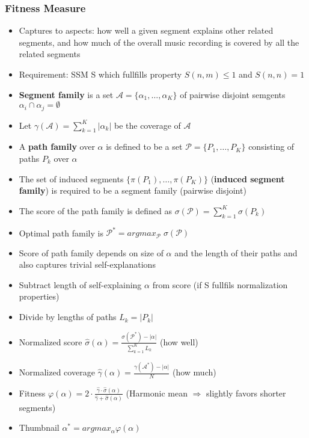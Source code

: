 \documentclass{scrartcl}
\newcommand{\ffrac}[2]{\ensuremath{\frac{\displaystyle #1}{\displaystyle #2}}}
\begin{document}
\subsubsection*{Fitness Measure}
\begin{itemize}
    \item
        Captures to aspects: how well a given segment explains other related segments, and how much of the overall music recording is covered by all the related segments
    \item
        Requirement: SSM S which fullfills property $S(n,m) \leq 1$ and $S(n,n) = 1$\\
    \item
        \textbf{Segment family} is a set $\mathcal{A}=\{\alpha_1, \dots, \alpha_K\}$ of pairwise disjoint semgents $\alpha_i \cap \alpha_j = \emptyset$
    \item
        Let $\gamma(\mathcal{A}) = \sum_{k=1}^{K} |\alpha_k|$ be the coverage of $\mathcal{A}$
    \item
        A \textbf{path family} over $\alpha$ is defined to be a set $\mathcal{P} = \{P_1, \dots, P_K\}$ consisting of paths $P_k$ over $\alpha$
    \item
        The set of induced segments $\{\pi(P_1), \dots, \pi(P_K)\}$ (\textbf{induced segment family}) is required to be a segment family (pairwise disjoint)
    \item
        The score of the path family is defined as $\sigma(\mathcal{P}) = \sum_{k=1}^K \sigma(P_k)$
    \item
        Optimal path family is $\mathcal{P}^* = argmax_{\mathcal{P}}\;\sigma(\mathcal{P})$\\
    \item
        Score of path family depends on size of $\alpha$ and the length of their paths and also captures trivial self-explanations
    \item
        Subtract length of self-explaining $\alpha$ from score (if S fullfils normalization properties)
    \item
        Divide by lengths of paths $L_k = |P_k|$
    \item
        Normalized score $\hat{\sigma}(\alpha) = \frac{\sigma(\mathcal{P}^*) - |\alpha|}{\sum_{k=1}^K L_k}$ (how well)
    \item
        Normalized coverage $\hat{\gamma}(\alpha) = \frac{\gamma(\mathcal{A}^*) - |\alpha|}{N}$ (how much)
    \item
        Fitness $\varphi(\alpha) = 2\cdot \ffrac{\hat{\gamma} \cdot \hat{\sigma}(\alpha)}{\hat{\gamma} + \hat{\sigma}(\alpha)}$ (Harmonic mean $\Rightarrow$ slightly favors shorter segments)
    \item
        Thumbnail $\alpha^* = argmax_{\alpha}\varphi(\alpha)$
\end{itemize}
\end{document}
